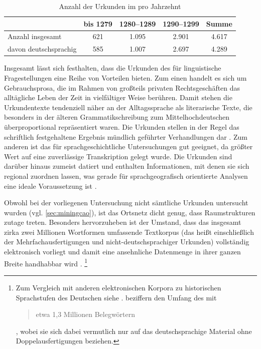 \begin{table}
\centering
\caption{Anzahl der Urkunden im \CAO{} pro Jahrzehnt
\autocite[40]{ganslmayer2012}}
\begin{tabularx}{\textwidth}{l C C C C}
\toprule
%
	& \textbf{bis 1279}
	& \textbf{1280--1289}
	& \textbf{1290--1299}
	& \textbf{Summe}
	\\

\midrule

Anzahl insgesamt
	& 621
	& 1.095
	& 2.901
	& 4.617
	\\

\midrule

davon deutschsprachig
	& 585
	& 1.007
	& 2.697
	& 4.289
	\\

\bottomrule
\end{tabularx}
\label{tab:urkstat}
\end{table}

Insgesamt lässt sich festhalten, dass die Urkunden des \CAO{} für
linguistische Fragestellungen eine Reihe von Vorteilen bieten. Zum einen
handelt es sich um Gebrauchsprosa, die im Rahmen von großteils privaten
Rechtsgeschäften das alltägliche Leben der Zeit in vielfältiger Weise berühren.
Damit stehen die Urkundentexte tendenziell näher an der Alltagssprache als
literarische Texte, die besonders in der älteren Grammatikschreibung zum
Mittelhochdeutschen überproportional repräsentiert waren. Die Urkunden stellen
in der Regel das schriftlich festgehaltene Ergebnis mündlich geführter
Verhandlungen dar \autocite[595]{schmidtwiegand1998b}. Zum anderen ist das
\CAO{} für sprachgeschichtliche Untersuchungen gut geeignet, da
größter Wert auf eine zuverlässige Transkription gelegt wurde. Die Urkunden
sind darüber hinaus zumeist datiert und enthalten Informationen, mit denen sie
sich regional zuordnen lassen, was gerade für sprachgeografisch orientierte
Analysen eine ideale Voraussetzung ist \autocite[22]{schulze2011}.

Obwohl bei der vorliegenen Untersuchung nicht sämtliche Urkunden untersucht
wurden (vgl. \cref{sec:miningcao}), ist das Ortsnetz dicht genug, dass
Raumstrukturen zutage treten. Besonders hervorzuheben ist der Umstand, dass das
insgesamt zirka zwei Millionen Wortformen umfassende Textkorpus (das heißt
einschließlich der Mehrfachausfertigungen und nicht-deutschsprachiger Urkunden)
vollständig elektronisch vorliegt \autocites{gniffkerapp2005}{cao-online} und
damit eine ansehnliche Datenmenge in ihrer ganzen Breite handhabbar wird
\autocite{beckerschallert2021,beckerschallert2022b}.%
%
	\footnote{Zum Vergleich mit anderen elektronischen Korpora zu historischen
	Sprachstufen des Deutschen siehe \citet{dipper2015}.
	\citet[391]{gniffkerapp2005} beziffern den Umfang des \CAO{} mit
	\blockquote{etwa 1,3 Millionen Belegwörtern}, wobei sie sich dabei
	vermutlich nur auf das deutschsprachige Material ohne Doppelausfertigungen
	beziehen.} %

